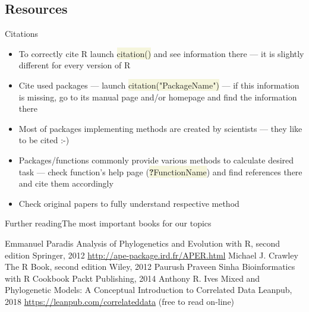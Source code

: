 \documentclass[compress, xelatex, 11pt, xcolor=svgnames, aspectratio=169,
	hyperref={
		bookmarks=true,
		unicode=true,
		colorlinks=true,
		pdftitle={Molecular data in R},
		plainpages=false,
		pdfauthor={Vojtech Zeisek},
		pdfsubject={Course about phylogeny and evolution in R},
		pdfcreator={XeLaTeX},
		pdfkeywords={R, evolution, phylogeny, molecular data},
		linkcolor=Crimson, %
		anchorcolor=Magenta, %
		citecolor=Magenta, %
		filecolor=Magenta, %
		menucolor=Magenta, %
		urlcolor=DodgerBlue, %
		},
	url={hyphens, lowtilde} %
	]{beamer}
\renewcommand{\texttt}[1]{\colorbox{Beige}{{\ttfamily #1}}}
\begin{document}
\subsection{Resources}

\begin{frame}{Citations}
	\begin{itemize}
		\item To correctly cite R launch \texttt{citation()} and see information there --- it is slightly different for every version of R
		\item Cite used packages --- launch \texttt{citation("PackageName")} --- if this information is missing, go to its manual page and/or homepage and find the information there
		\item Most of packages implementing methods are created by scientists --- they like to be cited :-)
		\item Packages/functions commonly provide various methods to calculate desired task --- check function's help page (\texttt{\textbf{?}FunctionName}) and find references there and cite them accordingly
		\item Check original papers to fully understand respective method
	\end{itemize}
\end{frame}

\begin{frame}{Further reading}{The most important books for our topics}
	\begin{multicols}{2}
		\begin{thebibliography}{1}
				Emmanuel Paradis
				\newblock Analysis of Phylogenetics and Evolution with R, second edition
				\newblock Springer, 2012
				\newblock \url{http://ape-package.ird.fr/APER.html}
				Michael J. Crawley
				\newblock The R Book, second edition
				\newblock Wiley, 2012
				Paurush Praveen Sinha
				\newblock Bioinformatics with R Cookbook
				\newblock Packt Publishing, 2014
				Anthony R. Ives
				\newblock Mixed and Phylogenetic Models: A Conceptual Introduction to Correlated Data
				\newblock Leanpub, 2018
				\newblock \url{https://leanpub.com/correlateddata} (free to read on-line)
		\end{thebibliography}
	\end{multicols}
\end{frame}
\end{document}

